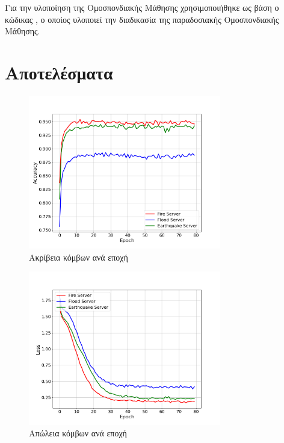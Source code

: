 Για την υλοποίηση της Ομοσπονδιακής Μάθησης χρησιμοποιήθηκε ως βάση ο κώδικας , ο οποίος υλοποιεί την διαδικασία της παραδοσιακής Ομοσπονδιακής Μάθησης.

\newpage

\section{Αποτελέσματα}

\begin{figure}[H]
    \centering
    \includegraphics[width=0.75\textwidth]{figures/chapter2/User_Accuracies.png}
    \caption{Ακρίβεια κόμβων ανά εποχή}
    \label{fig1}
\end{figure}

\begin{figure}[H]
    \centering
    \includegraphics[width=0.75\textwidth]{figures/chapter2/User_Losses.png}
    \caption{Απώλεια κόμβων ανά εποχή}
    \label{fig2}
\end{figure}

